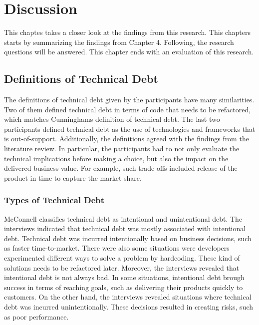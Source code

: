 \chapter{Discussion}
This chaptes takes a closer look at the findings from this research. This chapters starts by summarizing the findings from Chapter 4. Following, the research questions will be answered. This chapter ends with an evaluation of this research.





\section{Definitions of Technical Debt}
The definitions of technical debt given by the participants have many similarities. Two of them defined technical debt in terms of code that needs to be refactored, which matches Cunninghams definition of technical debt\cite{p29-cunningham}. The last two participants defined technical debt as the use of technologies and frameworks that is out-of-support. Additionally, the definitions agreed with the findings from the literature review. In particular, the participants had to not only evaluate the technical implications before making a choice, but also the impact on the delivered business value. For example, such trade-offs included release of the product in time to capture the market share. 

\subsection{Types of Technical Debt}
McConnell classifies technical debt as intentional and unintentional debt\cite{url-mcconnell}. The interviews indicated that technical debt was mostly associated with intentional debt. Technical debt was incurred intentionally based on business decisions, such as faster time-to-market. There were also some situations were developers experimented different ways to solve a problem by hardcoding. These kind of solutions needs to be refactored later. Moreover, the interviews revealed that intentional debt is not always bad. In some situations, intentional debt brough success in terms of reaching goals, such as delivering their products quickly to customers. On the other hand, the interviews revealed situations where technical debt was incurred unintentionally. These decisions resulted in creating risks, such as poor performance. 

